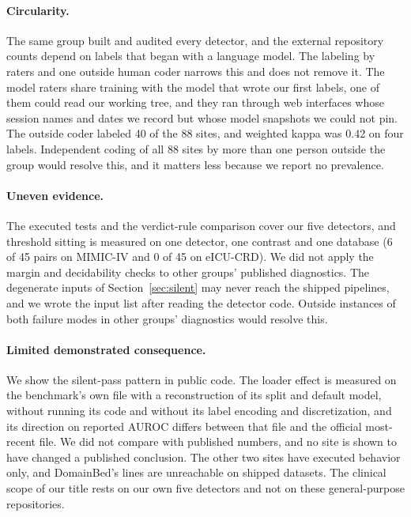 \documentclass[10pt]{article}
\theoremstyle{definition}
\begin{document}
\paragraph{Circularity.} The same group built and audited every detector, and the external repository counts depend on labels that began with a language model. The labeling by raters and one outside human coder narrows this and does not remove it. The model raters share training with the model that wrote our first labels, one of them could read our working tree, and they ran through web interfaces whose session names and dates we record but whose model snapshots we could not pin. The outside coder labeled 40 of the 88 sites, and weighted kappa was 0.42 on four labels. Independent coding of all 88 sites by more than one person outside the group would resolve this, and it matters less because we report no prevalence.

\paragraph{Uneven evidence.} The executed tests and the verdict-rule comparison cover our five detectors, and threshold sitting is measured on one detector, one contrast and one database (6 of 45 pairs on MIMIC-IV and 0 of 45 on eICU-CRD). We did not apply the margin and decidability checks to other groups' published diagnostics. The degenerate inputs of Section~\ref{sec:silent} may never reach the shipped pipelines, and we wrote the input list after reading the detector code. Outside instances of both failure modes in other groups' diagnostics would resolve this.

\paragraph{Limited demonstrated consequence.} We show the silent-pass pattern in public code. The loader effect is measured on the benchmark's own file with a reconstruction of its split and default model, without running its code and without its label encoding and discretization, and its direction on reported AUROC differs between that file and the official most-recent file. We did not compare with published numbers, and no site is shown to have changed a published conclusion. The other two sites have executed behavior only, and DomainBed's lines are unreachable on shipped datasets. The clinical scope of our title rests on our own five detectors and not on these general-purpose repositories.
\end{document}
